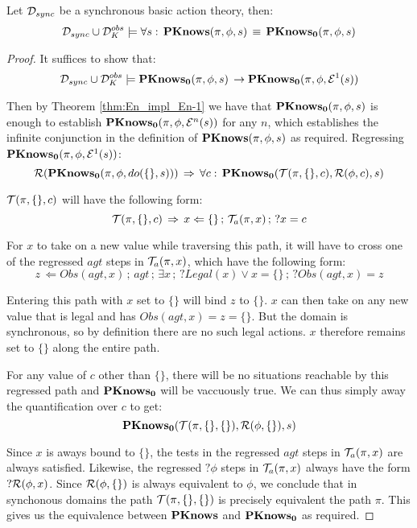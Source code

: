 \begin{thm}
Let $\mathcal{D}_{sync}$ be a synchronous basic action theory, then:\[
\mathcal{D}_{sync}\cup\mathcal{D}_{K}^{obs}\models\forall s:\,\mathbf{PKnows}(\pi,\phi,s)\,\equiv\,\mathbf{PKnows_{0}}(\pi,\phi,s)\]

\end{thm}
\begin{proof}
It suffices to show that:\[
\mathcal{D}_{sync}\cup\mathcal{D}_{K}^{obs}\models\mathbf{PKnows_{0}}(\pi,\phi,s)\,\rightarrow\mathbf{PKnows_{0}}(\pi,\phi,\mathcal{E}^{1}(s))\]


Then by Theorem \ref{thm:En_impl_En-1} we have that $\mathbf{PKnows_{0}}(\pi,\phi,s)$
is enough to establish $\mathbf{PKnows_{0}}(\pi,\phi,\mathcal{E}^{n}(s))$ for
any $n$, which establishes the infinite conjunction in the definition
of $\mathbf{PKnows}(\pi,\phi,s)$ as required. Regressing $\mathbf{PKnows_{0}}(\pi,\phi,\mathcal{E}^{1}(s))$:\[
\mathcal{R}(\mathbf{PKnows_{0}}(\pi,\phi,do(\{\},s)))\,\Rightarrow\,\forall c:\,\mathbf{PKnows_{0}}(\mathcal{T}(\pi,\{\},c),\mathcal{R}(\phi,c),s)\]


$\mathcal{T}(\pi,\{\},c)$ will have the following form:\[
\mathcal{T}(\pi,\{\},c)\,\Rightarrow\, x\Leftarrow\{\}\,;\,\mathcal{T}_{a}(\pi,x)\,;\,?x=c\]


For $x$ to take on a new value while traversing this path, it will
have to cross one of the regressed $agt$ steps in $\mathcal{T}_{a}(\pi,x)$,
which have the following form:\[
z\,\Leftarrow Obs(agt,x)\,;\, agt\,;\,\exists x\,;\,?Legal(x)\vee x=\{\}\,;\,?Obs(agt,x)=z\]


Entering this path with $x$ set to $\{\}$ will bind $z$ to $\{\}$.
$x$ can then take on any new value that is legal and has $Obs(agt,x)=z=\{\}$.
But the domain is synchronous, so by definition there are no such
legal actions. $x$ therefore remains set to $\{\}$ along the entire
path.

For any value of $c$ other than $\{\}$, there will be no situations
reachable by this regressed path and $\mathbf{PKnows_{0}}$ will be vaccuously
true. We can thus simply away the quantification over $c$ to get:\[
\mathbf{PKnows_{0}}(\mathcal{T}(\pi,\{\},\{\}),\mathcal{R}(\phi,\{\}),s)\]


Since $x$ is aways bound to $\{\}$, the tests in the regressed $agt$
steps in $\mathcal{T}_{a}(\pi,x)$ are always satisfied. Likewise, the regressed
$?\phi$ steps in $\mathcal{T}_{a}(\pi,x)$ always have the form $?\mathcal{R}(\phi,x)$.
Since $\mathcal{R}(\phi,\{\})$ is always equivalent to $\phi$, we conclude
that in synchonous domains the path $\mathcal{T}(\pi,\{\},\{\})$ is precisely
equivalent the path $\pi$. This gives us the equivalence between
$\mathbf{PKnows}$ and $\mathbf{PKnows_{0}}$ as required.
\end{proof}



